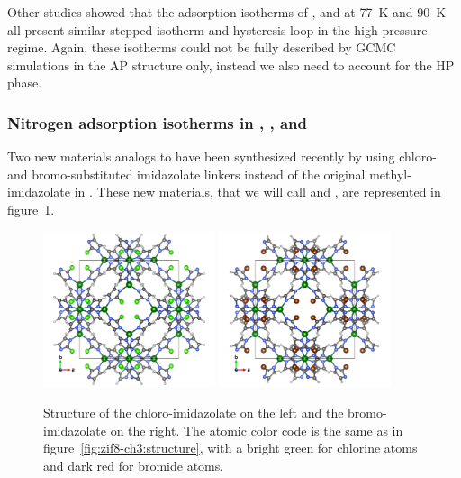 \documentclass[thesis]{subfiles}
\begin{document}
Other studies\cite{FairenJimenez2012, Ania2012} showed that the adsorption
isotherms of ,  and  at \SI{77}{K} and \SI{90}{K} all
present similar stepped isotherm and hysteresis loop in the high pressure
regime. Again, these isotherms could not be fully described by GCMC simulations
in the AP structure only, instead we also need to account for the HP phase.

\subsubsection{Nitrogen adsorption isotherms in , \ZIFCl, and \ZIFBr}

Two new materials analogs to  have been synthesized recently by
\citeauthor{Li2009}\cite{Li2009} using chloro- and bromo-substituted imidazolate
linkers instead of the original methyl-imidazolate in . These new
materials, that we will call \ZIFCl and \ZIFBr, are represented in
figure~\ref{fig:zif8x:structures}.

\begin{figure}[ht]
    \centering
    \includegraphics[width=0.45\textwidth]{figures/images/ZIF8-Cl}
    \hfill
    \includegraphics[width=0.45\textwidth]{figures/images/ZIF8-Br}
    \caption{Structure of the chloro-imidazolate \ZIFCl on the left and the
    bromo-imidazolate \ZIFBr on the right. The atomic color code is the same
    as in figure~\ref{fig:zif8-ch3:structure}, with a bright green for chlorine
    atoms and dark red for bromide atoms.}
    \label{fig:zif8x:structures}
\end{figure}
\end{document}
